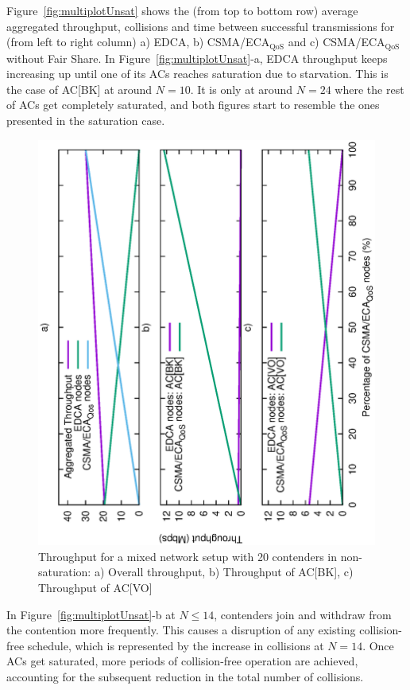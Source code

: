 \begin{itemize}
Figure~\ref{fig:multiplotUnsat} shows the (from top to bottom row) average aggregated throughput, collisions and time between successful transmissions for (from left to right column) a) EDCA, b) CSMA/ECA$_{\text{QoS}}$ and c) CSMA/ECA$_{\text{QoS}}$ without Fair Share. In Figure~\ref{fig:multiplotUnsat}-a, EDCA throughput keeps increasing up until one of its ACs reaches saturation due to starvation. This is the case of AC[BK] at around $N=10$. It is only at around $N=24$ where the rest of ACs get completely saturated, and both figures start to resemble the ones presented in the saturation case.

\begin{figure}[t!]
	\centering
		\includegraphics[width=1.1\linewidth,angle = -90]{figures/legacyEvolution.eps}
		\caption{Throughput for a mixed network setup with 20 contenders in non-saturation: a) Overall throughput, b) Throughput of AC[BK], c) Throughput of AC[VO]}
		\label{fig:legacyEvolution}
\end{figure}

In Figure~\ref{fig:multiplotUnsat}-b at $N\leq 14$, contenders join and withdraw from the contention more frequently. This causes a disruption of any existing collision-free schedule, which is represented by the increase in collisions at $N=14$. Once ACs get saturated, more periods of collision-free operation are achieved, accounting for the subsequent reduction in the total number of collisions.


\end{itemize}
